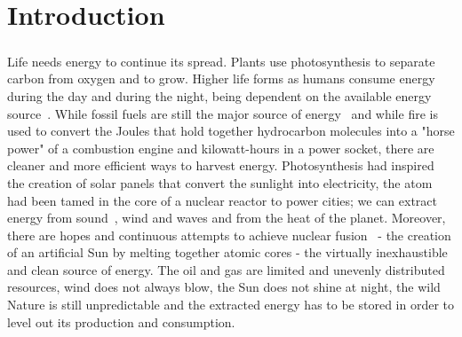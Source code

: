 \chapter{Introduction}
\paragraph*{}
Life needs energy to continue its spread. Plants use photosynthesis to separate carbon from oxygen and to grow. Higher life forms as humans consume energy during the day and during the night, being dependent on the available energy source~\cite{energy_consumption_review}. While fossil fuels are still the major source of energy~\cite{energy_sources_review} and while fire is used to convert the Joules that hold together hydrocarbon molecules into a "horse power" of a combustion engine and kilowatt-hours in a power socket, there are cleaner and more efficient ways to harvest energy. Photosynthesis had inspired the creation of solar panels that convert the sunlight into electricity, the atom had been tamed in the core of a nuclear reactor to power cities; we can extract energy from sound~\cite{energy_from_sound}, wind and waves and from the heat of the planet. Moreover, there are hopes and continuous attempts to achieve nuclear fusion~\cite{tokamak_updates} - the creation of an artificial Sun by melting together atomic cores - the virtually inexhaustible and clean source of energy. The oil and gas are limited and unevenly distributed resources, wind does not always blow, the Sun does not shine at night, the wild Nature is still unpredictable and the extracted energy has to be stored in order to level out its production and consumption.\\
